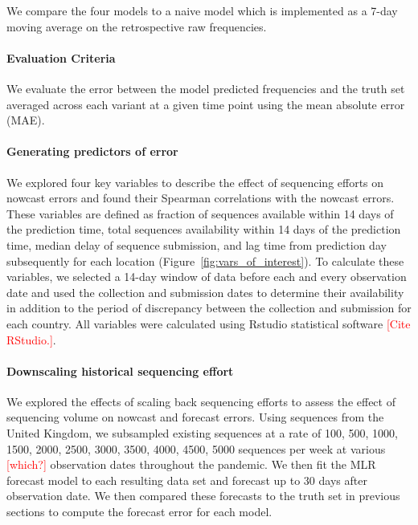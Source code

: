 \documentclass[11pt,oneside,letterpaper]{article}
\def\jhc#1{\textcolor{red}{[#1]}}
\begin{document}
We compare the four models to a naive model which is implemented as a 7-day moving average on the retrospective raw frequencies.

\paragraph{Evaluation Criteria}

We evaluate the error between the model predicted frequencies and the truth set averaged across each variant at a given time point using the mean absolute error (MAE).

\paragraph{Generating predictors of error}

We explored four key variables to describe the effect of sequencing efforts on nowcast errors and found their Spearman correlations with the nowcast errors.
These variables are defined as fraction of sequences available within 14 days of the prediction time, total sequences availability within 14 days of the prediction time, median delay of sequence submission, and lag time from prediction day subsequently for each location (Figure~\ref{fig:vars_of_interest}).
To calculate these variables, we selected a 14-day window of data before each and every observation date and used the collection and submission dates to determine their availability in addition to the period of discrepancy between the collection and submission for each country.
All variables were calculated using Rstudio statistical software \jhc{Cite RStudio.}.



\paragraph{Downscaling historical sequencing effort}

We explored the effects of scaling back sequencing efforts to assess the effect of sequencing volume on nowcast and forecast errors.
Using sequences from the United Kingdom, we subsampled existing sequences at a rate of 100, 500, 1000, 1500, 2000, 2500, 3000, 3500, 4000, 4500, 5000 sequences per week at various \jhc{which?} observation dates throughout the pandemic.
We then fit the MLR forecast model to each resulting data set and forecast up to 30 days after observation date.
We then compared these forecasts to the truth set in previous sections to compute the forecast error for each model.
\end{document}
